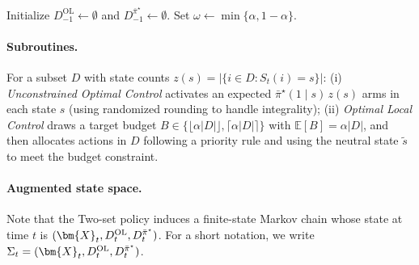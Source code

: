 \documentclass[mnsc,nonblindrev]{informs3}
\newcommand{\pibst}{\Bar{\pi}^\star}
\begin{document}
\begin{APPENDICES}
\begin{algorithm}[H]
Initialize \(D_{-1}^{\mathrm{OL}}\gets\emptyset\) and
\(D_{-1}^{\bar\pi^\star}\gets\emptyset\).
Set \(\omega\gets\min\{\alpha,1-\alpha\}\).

\end{algorithm}
\paragraph{Subroutines.}
For a subset $D$ with state counts $z(s)=|\{i\in D:S_t(i)=s\}|$:
(i) \emph{Unconstrained Optimal Control} activates an expected $\bar\pi^\star(1\mid s)\,z(s)$ arms in each state $s$
(using randomized rounding to handle integrality);
(ii) \emph{Optimal Local Control} draws a target budget $B\in\{\lfloor \alpha|D|\rfloor,\lceil \alpha|D|\rceil\}$ with
$\mathbb E[B]=\alpha|D|$, and then allocates actions in $D$ following a priority rule and using the neutral state $\tilde s$ to meet the budget constraint.

\paragraph{Augmented state space.} Note that the Two-set policy induces a finite-state Markov chain whose state at time $t$ is $(\bm{X}_t,D_t^{\mathrm{OL}},D_t^{\pibst})$. For a short notation, we write $\Sigma_t=(\bm{X}_t,D_t^{\mathrm{OL}},D_t^{\pibst})$.


\end{APPENDICES}
\end{document}
